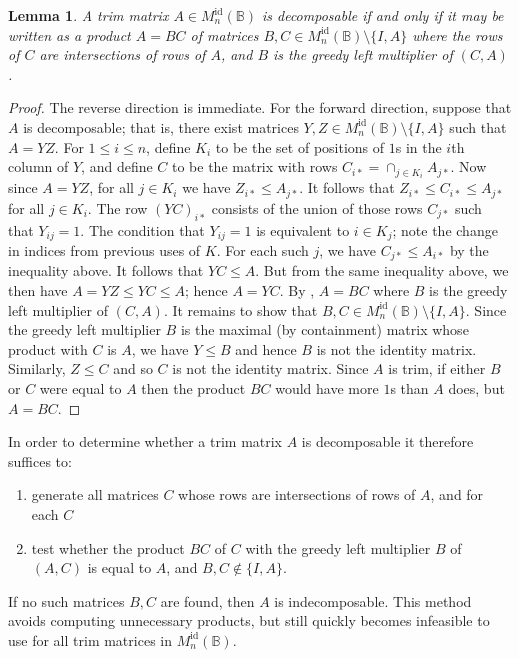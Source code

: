 \documentclass[11pt]{article}
\newtheorem{lemma}[thm]{Lemma}
\numberwithin{equation}{section}
\newcommand{\B}{\mathbb{B}}
\newcommand{\Refln}{M_n^{\text{id}}(\B)}
\begin{document}
\begin{lemma}
  A trim matrix $A \in \Refln$ is decomposable if and only if it may be written
  as a product $A = BC$ of matrices $B, C \in \Refln\setminus\{I, A\}$ where the
  rows of $C$ are intersections of rows of $A$, and $B$ is the greedy left
  multiplier of $(C, A)$.
\end{lemma}
\begin{proof}
  The reverse direction is immediate. For the forward direction, suppose that
  $A$ is decomposable; that is, there exist matrices $Y, Z \in
  \Refln\setminus\{I, A\}$ such that $A = YZ$. For $1 \leq i \leq n$, define
  $K_i$ to be the set of positions of $1$s in the $i$th column of $Y$, and
  define $C$ to be the matrix with rows $C_{i*} = \cap_{j \in K_i} A_{j*}$.
  Now since $A = YZ$, for all $j \in K_i$ we have $Z_{i*} \leq A_{j*}$. It
  follows that $Z_{i*} \leq C_{i*} \leq A_{j*}$ for all $j \in K_i$. The row
  $(YC)_{i*}$ consists of the union of those rows $C_{j*}$ such that $Y_{ij} =
  1$. The condition that $Y_{ij} = 1$ is equivalent to $i \in K_j$; note the
  change in indices from previous uses of $K$. For each such $j$, we have
  $C_{j*} \leq A_{i*}$ by the inequality above. It follows that $YC \leq A$. But
  from the same inequality above, we then have $A = YZ \leq YC \leq A$; hence $A
  = YC$. By , $A = BC$ where $B$ is the greedy left
  multiplier of $(C, A)$. It remains to show that $B, C \in \Refln\setminus\{I,
    A\}$. Since the greedy left multiplier $B$ is the maximal (by containment)
  matrix whose product with $C$ is $A$, we have $Y \leq B$ and hence $B$ is not
  the identity matrix. Similarly, $Z \leq C$ and so $C$ is not the identity
  matrix. Since $A$ is trim, if either $B$ or $C$ were equal to $A$ then the
  product $BC$ would have more $1$s than $A$ does, but $A = BC$.
\end{proof}

In order to determine whether a trim matrix $A$ is decomposable it therefore
suffices to:
\begin{enumerate}
  \item generate all matrices $C$ whose rows are intersections of rows of $A$,
    and for each $C$
  \item test whether the product $BC$ of $C$ with the greedy left multiplier
    $B$ of $(A, C)$ is equal to $A$, and $B, C \not\in \{I, A\}$.
\end{enumerate}
If no such matrices $B, C$ are found, then $A$ is indecomposable. This method
avoids computing unnecessary products, but still quickly becomes infeasible to
use for all trim matrices in $\Refln$.\\
\end{document}
